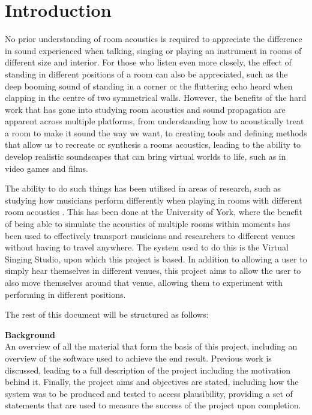 \documentclass[../../main.tex]{subfiles}
\begin{document}
\section{Introduction}

	No prior understanding of room acoustics is required to appreciate the difference in sound experienced when talking, singing or playing an instrument in rooms of different size and interior. For those who listen even more closely, the effect of standing in different positions of a room can also be appreciated, such as the deep booming sound of standing in a corner or the fluttering echo heard when clapping in the centre of two symmetrical walls. However, the benefits of the hard work that has gone into studying room acoustics and sound propagation are apparent across multiple platforms, from understanding how to acoustically treat a room to make it sound the way we want, to creating tools and defining methods that allow us to recreate or synthesis a rooms acoustics, leading to the ability to develop realistic soundscapes that can bring virtual worlds to life, such as in video games and films.

	The ability to do such things has been utilised in areas of research, such as studying how musicians perform differently when playing in rooms with different room acoustics \cite{Brereton2014}. This has been done at the University of York, where the benefit of being able to simulate the acoustics of multiple rooms within moments has been used to effectively transport musicians and researchers to different venues without having to travel anywhere. The system used to do this is the Virtual Singing Studio, upon which this project is based. In addition to allowing a user to simply hear themselves in different venues, this project aims to allow the user to also move themselves around that venue, allowing them to experiment with performing in different positions.

	The rest of this document will be structured as follows:

	\textbf{Background}\\
		An overview of all the material that form the basis of this project, including an overview of the software used to achieve the end result. Previous work is discussed, leading to a full description of the project including the motivation behind it. Finally, the project aims and objectives are stated, including how the system was to be produced and tested to access plausibility, providing a set of statements that are used to measure the success of the project upon completion.
\end{document}
